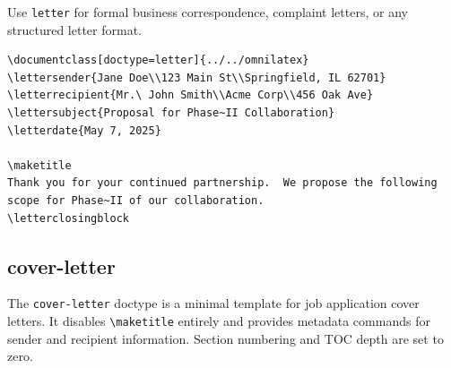Use \texttt{letter} for formal business correspondence, complaint letters,
or any structured letter format.

\begin{verbatim}
\documentclass[doctype=letter]{../../omnilatex}
\lettersender{Jane Doe\\123 Main St\\Springfield, IL 62701}
\letterrecipient{Mr.\ John Smith\\Acme Corp\\456 Oak Ave}
\lettersubject{Proposal for Phase~II Collaboration}
\letterdate{May 7, 2025}

\maketitle
Thank you for your continued partnership.  We propose the following
scope for Phase~II of our collaboration.
\letterclosingblock

\end{verbatim}

\subsection{cover-letter}

The \texttt{cover-letter} doctype is a minimal template for job application
cover letters.  It disables \texttt{\textbackslash maketitle} entirely and
provides metadata commands for sender and recipient information.  Section
numbering and TOC depth are set to zero.


